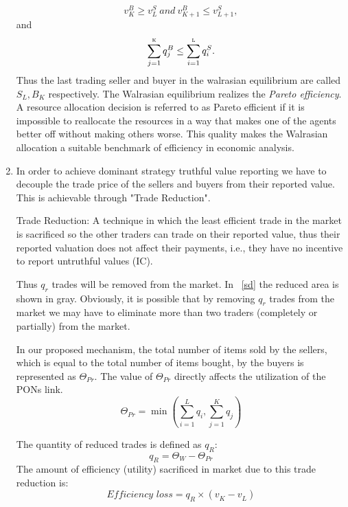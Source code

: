 \begin{enumerate}
\begin{equation}
v^{B}_K\geq v^{S}_L \ \textit{and} \ v^{B}_{K+1} \leq v^{S}_{L+1},
\end{equation}
\vspace{-1mm}
and
\vspace{-1mm}
\begin{equation}
\sum_{j=1}^\textsc{k} q_{j}^B \leq \sum_{i=1}^\textsc{l} q_{i}^S.
\end{equation}
Thus the last trading seller and buyer in the walrasian equilibrium are called $S_L , B_K$ respectively.
The Walrasian equilibrium realizes the \textit{Pareto efficiency}. A resource allocation decision is referred to as Pareto efficient if it is impossible to reallocate the resources in a way that makes one of the agents better off without making others worse. This quality makes the Walrasian allocation a suitable benchmark of efficiency in economic analysis.


\item In order to achieve dominant strategy truthful value reporting we have to decouple the trade price of the sellers and buyers from their reported value. This is achievable through "Trade Reduction".

\begin{Definition}
Trade Reduction:
A technique in which the least efficient trade in the market is sacrificed so the other traders can trade on their reported value, thus their reported valuation does not affect their payments, i.e., they have no incentive to report untruthful values (IC).
\end{Definition}
Thus $q_{r}$ trades will be removed from the market. In \figureautorefname~\ref{sd} the reduced area is shown in gray. Obviously, it is possible that by removing $q_{r}$ trades from the market we may have to eliminate more than two traders (completely or partially) from the market.

In our proposed mechanism, the total number of items sold by the sellers, which is equal to the total number of items bought, by the buyers is represented as $\Theta^{}_{Pr}$. The value of $\Theta^{}_{Pr}$ directly affects the utilization of the \acp{PON} link.
\vspace{-2mm}
\begin{equation}
\Theta^{}_{Pr} = \min (\sum_{i=1}^{L}{q_{i}}, \sum_{j=1}^{K}{q_{j}})
\end{equation}

The quantity of reduced trades is defined as $q^{}_R$:
\begin{equation}
q^{}_R = \Theta^{}_W - \Theta^{}_{Pr}
\end{equation}
The amount of efficiency (utility) sacrificed in market due to this trade reduction is:
\begin{equation}
\textit{Efficiency loss} = q^{}_R \times (v^{}_K-v^{}_L)
\end{equation}


\end{enumerate}
